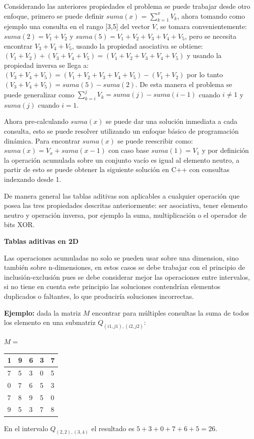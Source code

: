 \documentclass[12pt, a4paper]{article}
\newcommand\cppfile[2][]{

}
\newcommand{\subtitulo}[1]{\begin{center}\textbf{#1}\end{center}}
\begin{document}
	Considerando las anteriores propiedades el problema se puede trabajar desde otro enfoque, primero se puede
	definir $suma(x)$ = $\sum_{k=1}^{x} V_{k}$, ahora tomando como ejemplo una consulta en el rango [3,5] 
	del vector $V$, se tomara convenientemente: $suma(2) = V_{1}+V_{2}$ y $suma(5) = V_{1}+V_{2}+V_{3}+V_{4}+V_{5}$,
	pero se necesita encontrar $V_{3}+V_{4}+V_{5}$, usando la propiedad asociativa se obtiene: 
	$(V_{1}+V_{2})+(V_{3}+V_{4}+V_{5})=(V_{1}+V_{2}+V_{3}+V_{4}+V_{5})$ y usando la propiedad inversa se llega a:
	$(V_{3}+V_{4}+V_{5})=(V_{1}+V_{2}+V_{3}+V_{4}+V_{5})-(V_{1}+V_{2})$ por lo tanto 
	$(V_{3}+V_{4}+V_{5})=suma(5)-suma(2)$. De esta manera el problema se puede generalizar como 
	$\sum_{k=i}^{j} V_{k} = suma(j) - suma(i-1)$ cuando $i \neq 1$ y $suma(j)$ cuando $i=1$.
	
	Ahora pre-calculando $suma(x)$ se puede dar una solución inmediata a cada consulta, esto se puede resolver 
	utilizando un enfoque básico de programación dinámica. Para encontrar $suma(x)$ se puede reescribir como: 
	$suma(x) = V_{x} + suma(x-1)$ con caso base $suma(1)=V_{1}$ y por definición la operación acumulada sobre un 
	conjunto vacío es igual al elemento neutro, a partir de esto se puede obtener la siguiente solución en 
	C++ con consultas indexando desde 1.
	\cppfile[6-14]{Estructuras_de_datos/codigos/tablas_aditivas.cpp}
	
	De manera general las tablas aditivas son aplicables a cualquier operación que posea las tres propiedades 
	descritas anteriormente: ser asociativa, tener elemento neutro y operación inversa, por ejemplo la suma,
	multiplicación o el operador de bits XOR.

	\subtitulo{Tablas aditivas en 2D}
	
	Las operaciones acumuladas no solo se pueden usar sobre una dimension, sino también sobre n-dimensiones, en estos
	casos se debe trabajar con el principio de inclusión-exclusión pues se debe considerar mejor las operaciones entre
	intervalos, si no tiene en cuenta este principio las soluciones contendrían elementos duplicados o faltantes, lo 
	que produciría soluciones incorrectas.
	
	\textbf{Ejemplo:} dada la matriz $M$ encontrar para múltiples consultas la suma de todos los elemento en una
	submatriz $Q_{(i1,j1),(i2,j2)}$:
	\begin{center}
		$M = $
		\begin{tabular}{|l|l|l|l|l|}
			\hline
			1  &9  &6 &3 &7\\ \hline
			7  &5  &3 &0 &5\\ \hline
			0  &7  &6 &5 &3\\ \hline
			7  &8  &9 &5 &0\\ \hline
			9  &5  &3 &7 &8\\ \hline
		\end{tabular}
	\end{center}
	En el intervalo $Q_{(2,2),(3,4)}$ el resultado es $5+3+0+7+6+5=26$.
\end{document}
